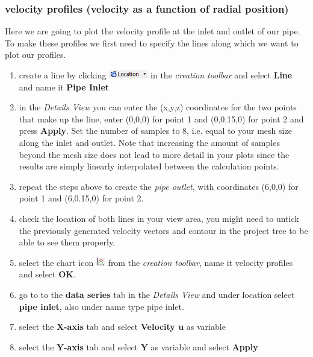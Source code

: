 \documentclass[11pt,a4paper,oneside,hidelinks]{scrartcl}
\newcommand\bfr[1]{\textcolor[rgb]{1,0.00,0.00}{\textbf{\textsf{#1}}}}
\begin{document}
\subsubsection{velocity profiles (velocity as a function of radial position)}
Here we are going to plot the velocity profile at the inlet and outlet of our pipe. To make these profiles we first need to specify the lines along which we want to plot our profiles.
\begin{enumerate}
\item create a line by clicking \includegraphics[width=1.7cm]{Location_icon.png} in the \emph{creation toolbar} and select \bfr{Line} and name it \bfr{Pipe Inlet}
\item in the \emph{Details View} you can enter the (x,y,z) coordinates for the two points that make up the line, enter (0,0,0) for point 1 and (0,0.15,0) for point 2 and press \bfr{Apply}. Set the number of samples to 8, i.e. equal to your mesh size along the inlet and outlet. Note that increasing the amount of samples beyond the mesh size does not lead to more detail in your plots since the results are simply linearly interpolated between the calculation points.
\item repeat the steps above to create the \emph{pipe outlet}, with coordinates (6,0,0) for point 1 and (6,0.15,0) for point 2.
\item check the location of both lines in your view area, you might need to untick the previously generated velocity vectors and contour in the project tree to be able to see them properly.
\item select the chart icon \includegraphics[width=0.4cm]{chart_icon.png} from the \emph{creation toolbar}, name it velocity profiles and select \bfr{OK}.
\item go to to the \bfr{data series} tab in the \emph{Details View} and under location select \bfr{pipe inlet}, also under name type pipe inlet.
\item select the \bfr{X-axis} tab and select \bfr{Velocity u} as variable
\item select the \bfr{Y-axis} tab and select \bfr{Y} as variable and select \bfr{Apply}
\end{enumerate}
\end{document}
